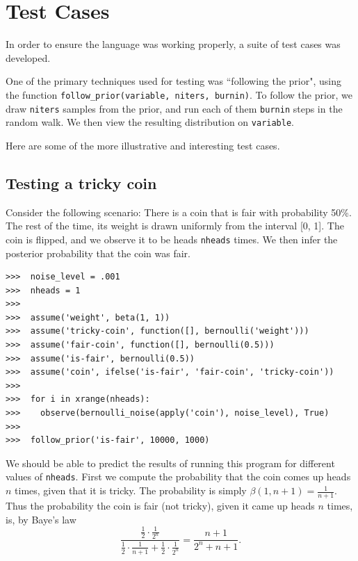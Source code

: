 \documentclass[11pt]{article}
\begin{document}
\pagebreak

\section{Test Cases}

In order to ensure the language was working properly, a suite of test cases was developed.  

One of the primary techniques used for testing was ``following the prior", using the function {\tt follow\_prior(variable, niters, burnin)}.  To follow the prior, we draw {\tt niters} samples from the prior, and run each of them {\tt burnin} steps in the random walk.  We then view the resulting distribution on {\tt variable}.  %

Here are some of the more illustrative and interesting test cases.


\subsection{Testing a tricky coin}

Consider the following scenario:  There is a coin that is fair with probability 50\%.  The rest of the time, its weight is drawn uniformly from the interval [0, 1].  The coin is flipped, and we observe it to be heads {\tt nheads} times.  We then infer the posterior probability that the coin was fair. 

\begin{small}
\begin{verbatim}
>>>  noise_level = .001
>>>  nheads = 1
>>>  
>>>  assume('weight', beta(1, 1))
>>>  assume('tricky-coin', function([], bernoulli('weight')))
>>>  assume('fair-coin', function([], bernoulli(0.5)))
>>>  assume('is-fair', bernoulli(0.5))
>>>  assume('coin', ifelse('is-fair', 'fair-coin', 'tricky-coin')) 
>>>
>>>  for i in xrange(nheads):
>>>    observe(bernoulli_noise(apply('coin'), noise_level), True)
>>>
>>>  follow_prior('is-fair', 10000, 1000)
\end{verbatim}
\end{small}


We should be able to predict the results of running this program for different values of {\tt nheads}.  First we compute the probability that the coin comes up heads $n$ times, given that it is tricky.  The probability is simply $\beta(1, n + 1) = \frac{1}{n +1}$.  Thus the probability the coin is fair (not tricky), given it came up heads $n$ times, is, by Baye's law $$\frac{\frac{1}{2} \cdot \frac{1}{2^n}}{\frac{1}{2} \cdot \frac{1}{n+1} + \frac{1}{2} \cdot \frac{1}{2^n}} = \frac{n+1}{ 2^n + n+1}.$$
\end{document}
